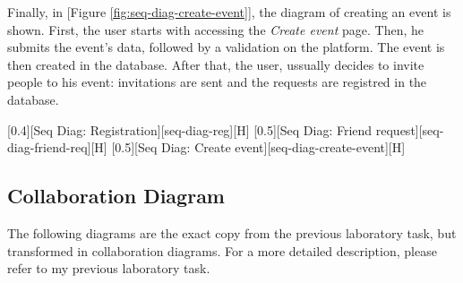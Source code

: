 \documentclass{article}
\begin{document}
			\bigskip
			Finally, in [Figure \ref{fig:seq-diag-create-event}], the diagram of creating an event is shown. First, the user starts with accessing the \textit{Create event} page. Then, he submits the event's data, followed by a validation on the platform. The event is then created in the database. After that, the user, ussually decides to invite people to his event: invitations are sent and the requests are registred in the database.

			[0.4][Seq Diag: Registration][seq-diag-reg][H]
			[0.5][Seq Diag: Friend request][seq-diag-friend-req][H]
			[0.5][Seq Diag: Create event][seq-diag-create-event][H]

		\subsection{Collaboration Diagram}
			The following diagrams are the exact copy from the previous laboratory task, but transformed in collaboration diagrams. For a more detailed description, please refer to my previous laboratory task.
\end{document}
